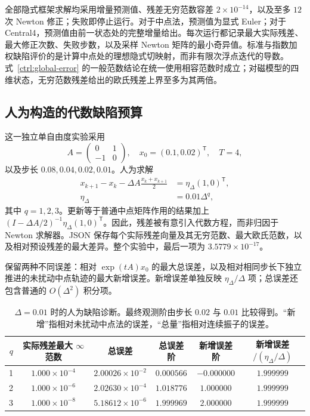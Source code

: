 全部隐式框架求解均采用增量预测值、残差无穷范数容差 $2\times10^{-14}$，以及至多 $12$ 次 Newton 修正；失败即停止运行。对于中点法，预测值为显式 Euler；对于 Central4，预测值由前一状态处的完整增量给出。每次运行都记录最大实际残差、最大修正次数、失败步数，以及采样 Newton 矩阵的最小奇异值。标准与指数加权缺陷评价的是计算中点处的理想隐式切映射，而非有限次浮点迭代的导数。式~\eqref{ctrl:global-error} 的一般范数结论在统一使用相容范数时成立；对磁模型的四维状态，无穷范数残差给出的欧氏残差上界至多为其两倍。

\subsection{人为构造的代数缺陷预算}
\label{sx:framework-defect}
这一独立单自由度实验采用
\begin{equation}
 A=\begin{pmatrix}0&1\\-1&0\end{pmatrix},\quad
 x_0=(0.1,0.02)^{\mathsf T},\quad T=4,
 \label{sx:defect-model}
\end{equation}
以及步长 $0.08,0.04,0.02,0.01$。人为求解
\begin{equation}
 \begin{aligned}
 x_{k+1}-x_k-\Delta A\frac{x_k+x_{k+1}}2
   &=\eta_\Delta(1,0)^{\mathsf T},\\
 \eta_\Delta&=0.01\Delta^q,
 \end{aligned}
 \label{sx:defect-injection}
\end{equation}
其中 $q=1,2,3$。更新等于普通中点矩阵作用的结果加上 $(I-\Delta A/2)^{-1}\eta_\Delta(1,0)^{\mathsf T}$。因此，残差被有意引入代数方程，而非归因于 Newton 求解器。JSON 保存每个实际残差向量及其无穷范数、最大欧氏范数，以及相对预设残差的最大差异。整个实验中，最后一项为 $3.5779\times10^{-17}$。

保留两种不同误差：相对 $\exp(tA)x_0$ 的最大总误差，以及相对相同步长下独立推进的未扰动中点轨迹的最大新增误差。新增误差单独反映 $\eta_\Delta/\Delta$ 项；总误差还包含普通的 $O(\Delta^2)$ 积分项。

\begin{table}[t]
\centering
\caption{$\Delta=0.01$ 时的人为缺陷诊断。最终观测阶由步长 $0.02$ 与 $0.01$ 比较得到。“新增”指相对未扰动中点法的误差，“总量”指相对连续振子的误差。}
\label{sx:defect-table}
\begin{tabular}{rccccc}
\toprule
$q$ & 实际残差最大 $\infty$ 范数 & 总误差 & 总误差阶 & 新增误差阶 & 新增误差$/ (\eta_\Delta/\Delta)$\\
\midrule
1 & $1.000\times10^{-4}$ & $2.00026\times10^{-2}$ & $0.000566$ & $-0.000000$ & $1.999999$ \\
2 & $1.000\times10^{-6}$ & $2.02630\times10^{-4}$ & $1.018776$ & $1.000000$ & $1.999999$ \\
3 & $1.000\times10^{-8}$ & $5.18612\times10^{-6}$ & $1.999969$ & $2.000000$ & $1.999999$ \\
\bottomrule
\end{tabular}
\end{table}

